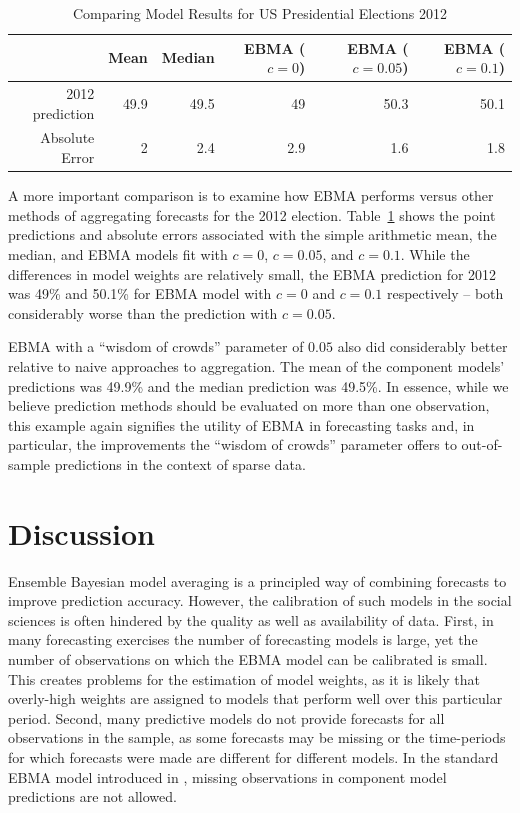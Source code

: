 \documentclass[12pt,fullpage,endnotes]{article}
\begin{document}
\begin{table}[ht]
\caption{Comparing Model Results for US Presidential Elections 2012}
\label{presModel12}
\begin{center}
\begin{tabular}{rrrrrr}

  \toprule
 & Mean & Median & EBMA ($c=0$) & EBMA ($c=0.05$) & EBMA ($c=0.1$) \\ 
  \midrule
2012 prediction & 49.9 & 49.5 & 49 & 50.3 & 50.1 \\ 
  Absolute Error & 2 & 2.4 & 2.9 & 1.6 & 1.8 \\ 
   \bottomrule
\end{tabular}
\end{center}
\end{table}

A more important comparison is to examine how EBMA performs versus
other methods of aggregating forecasts for the 2012 election.
Table~\ref{presModel12} shows the point predictions and absolute
errors associated with the simple arithmetic mean, the median, and
EBMA models fit with $c=0$, $c=0.05$, and $c=0.1$.  While the
differences in model weights are relatively small, the EBMA prediction
for 2012 was 49\% and 50.1\% for EBMA model with $c=0$ and $c=0.1$
respectively -- both considerably worse than the prediction with
$c=0.05$.

EBMA with a ``wisdom of crowds'' parameter of $0.05$ also did
considerably better relative to naive approaches to aggregation. The
mean of the component models' predictions was 49.9\% and the median
prediction was 49.5\%. In essence, while we believe prediction methods
should be evaluated on more than one observation, this example again
signifies the utility of EBMA in forecasting tasks and, in particular,
the improvements the ``wisdom of crowds'' parameter offers to
out-of-sample predictions in the context of sparse data.


\section{Discussion} 
Ensemble Bayesian model averaging is a principled way of combining
forecasts to improve prediction accuracy. However, the calibration of
such models in the social sciences is often hindered by the quality as
well as availability of data. First, in many forecasting exercises the number
of forecasting models is large, yet the number of observations on
which the EBMA model can be calibrated is small. This creates problems
for the estimation of model weights, as it is likely that overly-high
weights are assigned to models that perform well over this
particular period. Second, many predictive models do not provide
forecasts for all observations in the sample, as some forecasts may be
missing or the time-periods for which forecasts were made are
different for different models. In the standard EBMA model introduced
in \citet{mhw:2012}, missing observations in component model
predictions are not allowed.
\end{document}
